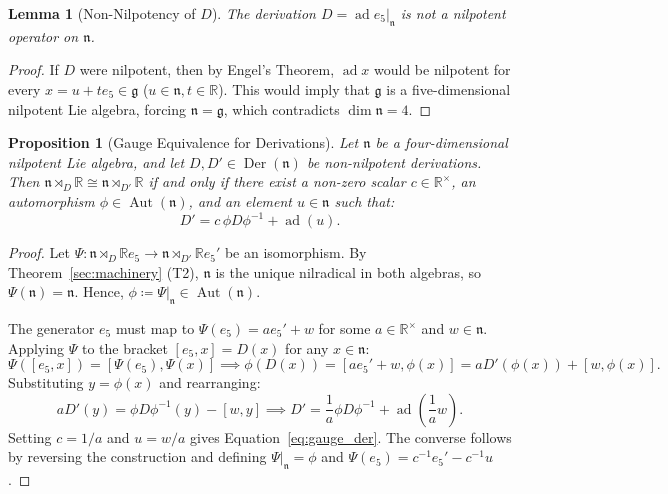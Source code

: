 \documentclass[11pt,a4paper]{article}
\newtheorem{lemma}[theorem]{Lemma}
\newtheorem{proposition}[theorem]{Proposition}
\theoremstyle{definition}
\theoremstyle{remark}
\newcommand{\R}{\mathbb{R}}
\newcommand{\g}{\mathfrak{g}}
\newcommand{\n}{\mathfrak{n}}
\newcommand{\ad}{\operatorname{ad}}
\newcommand{\Aut}{\operatorname{Aut}}
\newcommand{\Der}{\operatorname{Der}}
\begin{document}
\begin{lemma}[Non-Nilpotency of $D$]\label{lem:non_nilp_D}
The derivation $D = \ad e_5|_\n$ is not a nilpotent operator on $\n$.
\end{lemma}
\begin{proof}
If $D$ were nilpotent, then by Engel's Theorem, $\ad x$ would be nilpotent for every $x = u + t e_5 \in \g$ ($u \in \n, t \in \R$). This would imply that $\g$ is a five-dimensional nilpotent Lie algebra, forcing $\n = \g$, which contradicts $\dim \n = 4$.
\end{proof}

\begin{proposition}[Gauge Equivalence for Derivations]\label{prop:gauge5d}
Let $\n$ be a four-dimensional nilpotent Lie algebra, and let $D, D' \in \Der(\n)$ be non-nilpotent derivations. Then $\n \rtimes_D \R \cong \n \rtimes_{D'} \R$ if and only if there exist a non-zero scalar $c \in \R^\times$, an automorphism $\phi \in \Aut(\n)$, and an element $u \in \n$ such that:
\begin{equation}\label{eq:gauge_der}
    D' = c \, \phi D \phi^{-1} + \ad(u).
\end{equation}
\end{proposition}

\begin{proof}
Let $\Psi \colon \n \rtimes_D \R e_5 \to \n \rtimes_{D'} \R e_5'$ be an isomorphism. By Theorem~\ref{sec:machinery} (T2), $\n$ is the unique nilradical in both algebras, so $\Psi(\n) = \n$. Hence, $\phi \coloneqq \Psi|_\n \in \Aut(\n)$. 

The generator $e_5$ must map to $\Psi(e_5) = a e_5' + w$ for some $a \in \R^\times$ and $w \in \n$. Applying $\Psi$ to the bracket $[e_5, x] = D(x)$ for any $x \in \n$:
\begin{equation}
    \Psi([e_5, x]) = [\Psi(e_5), \Psi(x)] \implies \phi(D(x)) = [a e_5' + w, \phi(x)] = a D'(\phi(x)) + [w, \phi(x)].
\end{equation}
Substituting $y = \phi(x)$ and rearranging:
\begin{equation}
    a D'(y) = \phi D \phi^{-1}(y) - [w, y] \implies D' = \frac{1}{a} \phi D \phi^{-1} + \ad\left(\frac{1}{a}w\right).
\end{equation}
Setting $c = 1/a$ and $u = w/a$ gives Equation~\eqref{eq:gauge_der}. The converse follows by reversing the construction and defining $\Psi|_\n = \phi$ and $\Psi(e_5) = c^{-1} e_5' - c^{-1} u$.
\end{proof}
\end{document}
